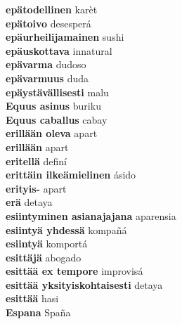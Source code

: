 \textbf{ epätodellinen  } karèt \\
\textbf{ epätoivo  } desesperá \\
\textbf{ epäurheilijamainen  } sushi \\
\textbf{ epäuskottava  } innatural \\
\textbf{ epävarma  } dudoso \\
\textbf{ epävarmuus  } duda \\
\textbf{ epäystävällisesti  } malu \\
\textbf{ Equus asinus  } buriku \\
\textbf{ Equus caballus  } cabay \\
\textbf{ erillään oleva  } apart \\
\textbf{ erillään  } apart \\
\textbf{ eritellä  } definí \\
\textbf{ erittäin ilkeämielinen  } ásido \\
\textbf{ erityis-  } apart \\
\textbf{ erä  } detaya \\
\textbf{ esiintyminen asianajajana  } aparensia \\
\textbf{ esiintyä yhdessä  } kompañá \\
\textbf{ esiintyä  } komportá \\
\textbf{ esittäjä  } abogado \\
\textbf{ esittää ex tempore  } improvisá \\
\textbf{ esittää yksityiskohtaisesti  } detaya \\
\textbf{ esittää  } hasi \\
\textbf{ Espana  } Spaña \\
